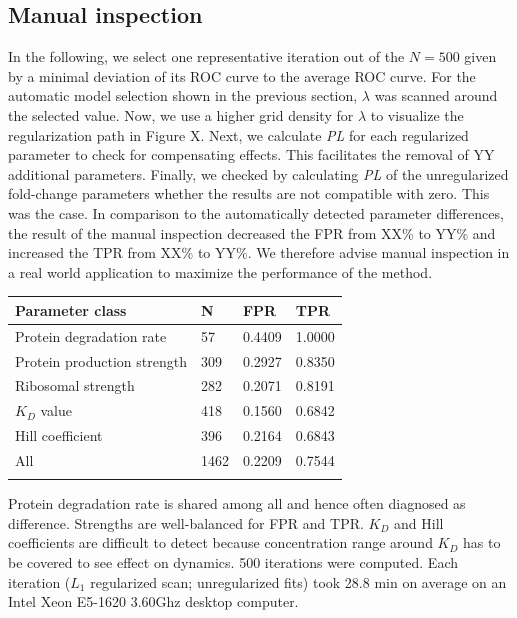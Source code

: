 \documentclass{bioinfo}
\begin{document}
\subsection{Manual inspection}
In the following, we select one representative iteration out of the $N=500$ given by a minimal deviation of its ROC curve to the average ROC curve.
For the automatic model selection shown in the previous section, $\lambda$ was scanned around the selected value.
Now, we use a higher grid density for $\lambda$ to visualize the regularization path in Figure X.
Next, we calculate \emph{PL} for each regularized parameter to check for compensating effects.
This facilitates the removal of YY additional parameters.
Finally, we checked by calculating \emph{PL} of the unregularized fold-change parameters whether the results are not compatible with zero.
This was the case.
In comparison to the automatically detected parameter differences, the result of the manual inspection decreased the FPR from XX\% to YY\% and increased the TPR from XX\% to YY\%.
We therefore advise manual inspection in a real world application to maximize the performance of the method.

\begin{table}[!t]
 {\begin{tabular}{@{}llll@{}}\toprule Parameter class &
N & FPR & TPR\\\midrule
Protein degradation rate & 57 & 0.4409 & 1.0000\\
Protein production strength & 309 & 0.2927 & 0.8350\\
Ribosomal strength & 282 & 0.2071 & 0.8191\\
$K_D$ value & 418 & 0.1560 & 0.6842\\
Hill coefficient & 396 & 0.2164 & 0.6843\\\hline
All & 1462 & 0.2209 & 0.7544\\\botrule
\end{tabular}}{Protein degradation rate is shared among all and hence often diagnosed as difference. Strengths are well-balanced for FPR and TPR. $K_D$ and Hill coefficients are difficult to detect because concentration range around $K_D$ has to be covered to see effect on dynamics. 500 iterations were computed. Each iteration ($L_1$ regularized scan; unregularized fits) took 28.8 min on average on an Intel Xeon E5-1620 3.60Ghz desktop computer.}
\end{table}
\end{document}
